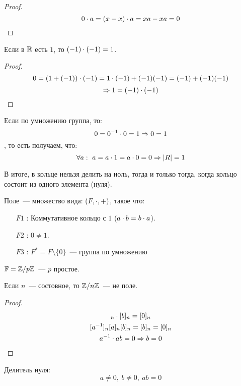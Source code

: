 \begin{proof}
  \[0 \cdot a = (x - x) \cdot a = xa - xa = 0\]
\end{proof}

\begin{proposition}
  Если в $\mathbb{R}$ есть $1$, то $(-1) \cdot (-1) = 1$.
\end{proposition}

\begin{proof}
  \[0 = (1 + (- 1)) \cdot (-1) = 1 \cdot (-1) + (-1) (-1) = (-1) + (-1) (-1)\]
  \[\Rightarrow 1 = (-1) \cdot (-1)\]
\end{proof}

\begin{note}
  Если по умножению группа, то:
  \[ 0 = 0^{-1} \cdot 0 = 1 \Rightarrow 0 = 1\]
  , то есть получаем, что: 
  \[\forall a: \ a = a \cdot 1 = a \cdot 0 = 0 \Rightarrow |R| = 1\]  
\end{note}
В итоге, в кольце нельзя делить на ноль, тогда и только тогда, когда кольцо состоит из одного элемента (нуля). 

\begin{definition}
  Поле~--- множество вида: $(F, \cdot, +)$, такое что:
  \begin{itemize}
    \item[$F1$]: Коммутативное кольцо с $1$ ($a \cdot b = b \cdot a$).
    \item[$F2$]: $0 \neq 1$.
    \item[$F3$]: $F^{*} = F \setminus  \{ 0 \}$~--- группа по умножению
  \end{itemize}
\end{definition}

\begin{example}
  $\mathbb{F} = \mathbb{Z} / p \mathbb{Z}$~--- $p$ простое.
\end{example}

\begin{proposition}
  Если $n$~--- состовное, то $\mathbb{Z} / n \mathbb{Z}$~--- не поле.
\end{proposition}

\begin{proof}
  \begin{gather}
    [a]_n \cd [b]_n = [0]_n \\
    [a^{-1}]_n [a]_n [b]_n = [b]_n = [0]_n \\
    a^{-1} \cd a b = 0 \Ra b = 0
  \end{gather}
\end{proof}

\begin{definition}
  Делитель нуля:
  \[a \neq 0, \ b \neq 0, \ ab = 0 \]
\end{definition}

